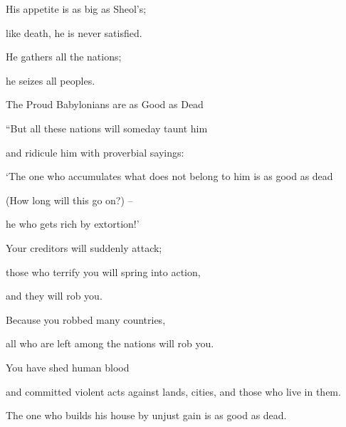 {\par }{\Q His appetite
is as big
as Sheol’s;
\par }{\Q like death,
he is never
satisfied.
\par }{\Q He gathers
all
the nations;
\par }{\Q he seizes
all
peoples.
\par }{\SH The Proud Babylonians are as Good as Dead
\par }{\Q {}“But
all
these
nations will someday taunt
him

\par }{\Q and ridicule
him with proverbial sayings:

\par }{\Q ‘The one who accumulates
what does not
belong to him is as good as
dead

\par }{\Q (How long
will this go on?) –
\par }{\Q he who gets rich by extortion!’
\par }{\Q {}Your creditors
will suddenly
attack;

\par }{\Q those who terrify
you will spring into action,
\par }{\Q and they will rob you.
\par }{\Q {}Because
you
robbed
many
countries,
\par }{\Q all
who are left among the nations
will rob
you.
\par }{\Q You have shed human
blood
\par }{\Q and committed violent
acts against lands,
cities,
and those who live in them.
\par }{\Q {}The one who builds
his house
by
unjust gain
is as good as dead.

}
